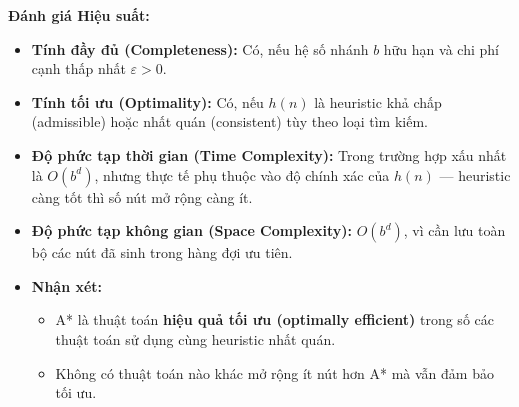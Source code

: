 \textbf{Đánh giá Hiệu suất:} \cite{russell2021}
\begin{itemize}
    \item \textbf{Tính đầy đủ (Completeness):} Có, nếu hệ số nhánh $b$ hữu hạn và chi phí cạnh thấp nhất $\varepsilon > 0$.
    \item \textbf{Tính tối ưu (Optimality):} Có, nếu $h(n)$ là heuristic khả chấp (admissible) 
    hoặc nhất quán (consistent) tùy theo loại tìm kiếm.
    \item \textbf{Độ phức tạp thời gian (Time Complexity):} Trong trường hợp xấu nhất là $O(b^d)$, 
    nhưng thực tế phụ thuộc vào độ chính xác của $h(n)$ — heuristic càng tốt thì số nút mở rộng càng ít.
    \item \textbf{Độ phức tạp không gian (Space Complexity):} $O(b^d)$, 
    vì cần lưu toàn bộ các nút đã sinh trong hàng đợi ưu tiên.
    \item \textbf{Nhận xét:} 
    \begin{itemize}
        \item A* là thuật toán \textbf{hiệu quả tối ưu (optimally efficient)} trong số các thuật toán sử dụng cùng heuristic nhất quán.  
        \item Không có thuật toán nào khác mở rộng ít nút hơn A* mà vẫn đảm bảo tối ưu.
    \end{itemize}
\end{itemize}
